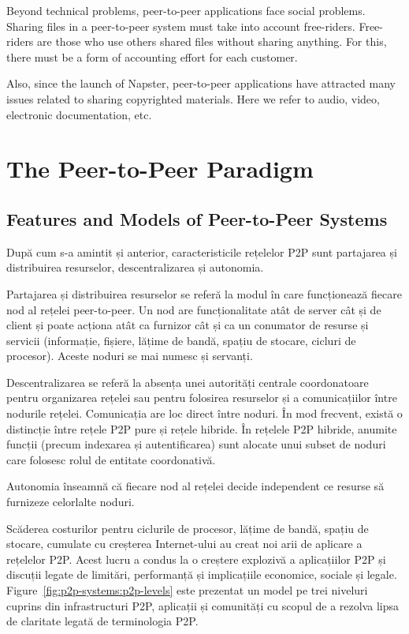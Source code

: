 Beyond technical problems, peer-to-peer applications face social problems.
Sharing files in a peer-to-peer system must take into account free-riders.
Free-riders are those who use others shared files without sharing anything. For
this, there must be a form of accounting effort for each customer.

Also, since the launch of Napster, peer-to-peer applications have attracted
many issues related to sharing copyrighted materials. Here we refer to audio,
video, electronic documentation, etc.

\section{The Peer-to-Peer Paradigm}
\label{sec:p2p-systems:paragigm}

\subsection{Features and Models of Peer-to-Peer Systems}

După cum s-a amintit și anterior, caracteristicile rețelelor P2P sunt
partajarea și distribuirea resurselor, descentralizarea și autonomia.

Partajarea și distribuirea resurselor se referă la modul în care funcționează
fiecare nod al rețelei peer-to-peer. Un nod are funcționalitate atât de server
cât și de client și poate acționa atât ca furnizor cât și ca un conumator de
resurse și servicii (informație, fișiere, lățime de bandă, spațiu de stocare,
cicluri de procesor). Aceste noduri se mai numesc și servanți.

Descentralizarea se referă la absența unei autorități centrale coordonatoare
pentru organizarea rețelei sau pentru folosirea resurselor și a comunicațiilor
între nodurile rețelei. Comunicația are loc direct între noduri. În mod
frecvent, există o distincție între rețele P2P pure și rețele hibride. În
rețelele P2P hibride, anumite funcții (precum indexarea și autentificarea)
sunt alocate unui subset de noduri care folosesc rolul de entitate
coordonativă.

Autonomia înseamnă că fiecare nod al rețelei decide independent ce resurse să
furnizeze celorlalte noduri.

Scăderea costurilor pentru ciclurile de procesor, lățime de bandă, spațiu de
stocare, cumulate cu creșterea Internet-ului au creat noi arii de aplicare a
rețelelor P2P. Acest lucru a condus la o creștere explozivă a aplicațiilor P2P
și discuții legate de limitări, performanță și implicațiile economice, sociale
și legale. Figure~\ref{fig:p2p-systems:p2p-levels} este prezentat un model pe
trei niveluri cuprins din infrastructuri P2P, aplicații și comunități cu
scopul de a rezolva lipsa de claritate legată de terminologia P2P.

